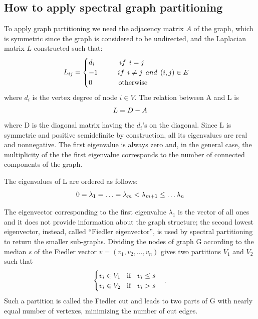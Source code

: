 \documentclass[]{usiinfbachelorproject}
\newcommand\tab[1][1cm]{\hspace*{#1}}
\begin{document}
\subsection{How to apply spectral graph partitioning}
To apply graph partitioning we need the adjacency matrix $A$ of the graph, which is symmetric since the graph is considered to be undirected, and the Laplacian matrix $L$ constructed such that: 
\begin{equation}\notag
L_{ij} = 
\begin{cases}
d_i \tab \:\:\: if \:\: i=j \\
-1 \tab if \:\: i \neq j \:\: and \: \: (i,j) \in E \\
0 \tab \:\:\:\: \text{otherwise}
\end{cases}
\end{equation}
where $d_i$ is the vertex degree of node $i \in V$.
The relation between A and L is
\begin{equation}\notag
L = D - A
\end{equation}
where D is the diagonal matrix having the $d_i$'s on the diagonal. Since L is symmetric and positive semidefinite by construction, all its eigenvalues are real and nonnegative. The first eigenvalue is always zero and, in the general case, the multiplicity of the the first eigenvalue corresponds to the number of connected components of the graph.

The eigenvalues of L are ordered as follows:
\begin{equation}\notag
0 = \lambda_1 = \ldots = \lambda_m < \lambda_{m+1} \le \ldots \lambda_n
\end{equation}

The eigenvector corresponding to the first eigenvalue $\lambda_1$ is the vector of all ones and it does not provide information about the graph structure; the second lowest eigenvector, instead, called ``Fiedler eigenvector'', is used by spectral partitioning to return the smaller sub-graphs. Dividing the nodes of graph G according to the median $s$ of the Fiedler vector $v = (v_1,v_2,...,v_n)$ gives two partitions $V_1$ and $V_2$ such that
\begin{equation}\notag
\begin{cases}
v_i \in V_1 \text{\;\; if \;\;} v_i \leq s \\
v_i \in V_2 \text{\;\; if \;\;} v_i > s
\end{cases} .
\end{equation}
Such a partition is called the Fiedler cut and leads to two parts of G with nearly equal number of vertexes, minimizing the number of cut edges. 
\end{document}
